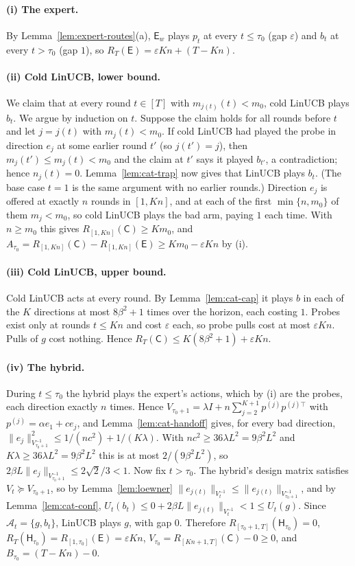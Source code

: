 \documentclass{article}
\theoremstyle{definition}
\theoremstyle{remark}
\newcommand{\eps}{\varepsilon}
\theoremstyle{remark}
\newcommand{\Cold}{\mathsf{C}}
\newcommand{\Exp}{\mathsf{E}}
\newcommand{\Hyb}{\mathsf{H}}
\begin{document}
\paragraph{(i) The expert.}
By Lemma~\ref{lem:expert-routes}(a), $\Exp_w$ plays $p_t$ at every $t\le\tau_0$
(gap $\eps$) and $b_t$ at every $t>\tau_0$ (gap $1$), so $R_T(\Exp)=\eps Kn+(T-Kn)$.

\paragraph{(ii) Cold LinUCB, lower bound.}
We claim that at every round $t\in[T]$ with $m_{j(t)}(t)<m_0$, cold LinUCB
plays $b_t$. We argue by induction on $t$. Suppose the claim holds for all
rounds before $t$ and let $j=j(t)$ with $m_j(t)<m_0$. If cold LinUCB had
played the probe in direction $e_j$ at some earlier round $t'$ (so $j(t')=j$),
then $m_j(t')\le m_j(t)<m_0$ and the claim at $t'$ says it played $b_{t'}$,
a contradiction; hence $n_j(t)=0$. Lemma~\ref{lem:cat-trap} now gives that
LinUCB plays $b_t$. (The base case $t=1$ is the same argument with no earlier
rounds.) Direction $e_j$ is offered at exactly $n$ rounds in $[1,Kn]$, and at
each of the first $\min\{n,m_0\}$ of them $m_j<m_0$, so cold LinUCB plays the
bad arm, paying $1$ each time. With $n\ge m_0$ this gives $R_{[1,Kn]}(\Cold)\ge Km_0$,
and $A_{\tau_0}=R_{[1,Kn]}(\Cold)-R_{[1,Kn]}(\Exp)\ge Km_0-\eps Kn$ by (i).

\paragraph{(iii) Cold LinUCB, upper bound.}
Cold LinUCB acts at every round. By Lemma~\ref{lem:cat-cap} it plays $b$ in
each of the $K$ directions at most $8\beta^2+1$ times over the horizon, each
costing $1$. Probes exist only at rounds $t\le Kn$ and cost $\eps$ each, so
probe pulls cost at most $\eps Kn$. Pulls of $g$ cost nothing. Hence
$R_T(\Cold)\le K(8\beta^2+1)+\eps Kn$.

\paragraph{(iv) The hybrid.}
During $t\le\tau_0$ the hybrid plays the expert's actions, which by (i) are
the probes, each direction exactly $n$ times. Hence
$V_{\tau_0+1}=\lambda I+n\sum_{j=2}^{K+1}p^{(j)}p^{(j)\top}$ with $p^{(j)}=\alpha e_1+ce_j$,
and Lemma~\ref{lem:cat-handoff} gives, for every bad direction,
$\|e_j\|^2_{V_{\tau_0+1}^{-1}}\le1/(nc^2)+1/(K\lambda)$. With $nc^2\ge36\lambda L^2=9\beta^2L^2$
and $K\lambda\ge36\lambda L^2=9\beta^2L^2$ this is at most $2/(9\beta^2L^2)$, so
$2\beta L\|e_j\|_{V_{\tau_0+1}^{-1}}\le2\sqrt2/3<1$. Now fix $t>\tau_0$. The
hybrid's design matrix satisfies $V_t\succeq V_{\tau_0+1}$, so by
Lemma~\ref{lem:loewner} $\|e_{j(t)}\|_{V_t^{-1}}\le\|e_{j(t)}\|_{V_{\tau_0+1}^{-1}}$,
and by Lemma~\ref{lem:cat-conf}, $U_t(b_t)\le0+2\beta L\|e_{j(t)}\|_{V_t^{-1}}<1\le U_t(g)$.
Since $\mathcal A_t=\{g,b_t\}$, LinUCB plays $g$, with gap $0$. Therefore
$R_{[\tau_0+1,T]}(\Hyb_{\tau_0})=0$, $R_T(\Hyb_{\tau_0})=R_{[1,\tau_0]}(\Exp)=\eps Kn$,
$V_{\tau_0}=R_{[Kn+1,T]}(\Cold)-0\ge0$, and $B_{\tau_0}=(T-Kn)-0$.
\end{document}
